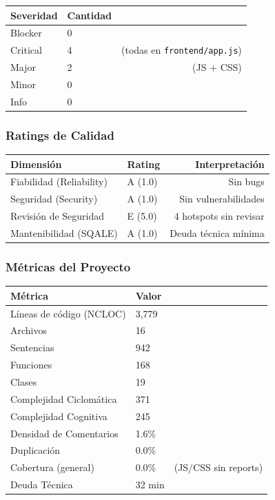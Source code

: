 \documentclass[12pt,a4paper]{article}
\begin{document}
\vspace{0.3cm}

\begin{tabularx}{\textwidth}{lXr}
  \toprule
  \textbf{Severidad} & \textbf{Cantidad} & \\
  \midrule
  Blocker & 0 & \\
  Critical & 4 & (todas en \texttt{frontend/app.js}) \\
  Major & 2 & (JS + CSS) \\
  Minor & 0 & \\
  Info & 0 & \\
  \bottomrule
\end{tabularx}

\subsubsection{Ratings de Calidad}

\begin{tabularx}{\textwidth}{lXr}
  \toprule
  \textbf{Dimensi\'on} & \textbf{Rating} & \textbf{Interpretaci\'on} \\
  \midrule
  Fiabilidad (Reliability) & A (1.0) & Sin bugs \\
  Seguridad (Security) & A (1.0) & Sin vulnerabilidades \\
  Revisi\'on de Seguridad & E (5.0) & 4 hotspots sin revisar \\
  Mantenibilidad (SQALE) & A (1.0) & Deuda t\'ecnica m\'inima \\
  \bottomrule
\end{tabularx}

\subsubsection{M\'etricas del Proyecto}

\begin{tabularx}{\textwidth}{lXr}
  \toprule
  \textbf{M\'etrica} & \textbf{Valor} & \\
  \midrule
  L\'ineas de c\'odigo (NCLOC) & 3,779 & \\
  Archivos & 16 & \\
  Sentencias & 942 & \\
  Funciones & 168 & \\
  Clases & 19 & \\
  Complejidad Ciclom\'atica & 371 & \\
  Complejidad Cognitiva & 245 & \\
  Densidad de Comentarios & 1.6\% & \\
  Duplicaci\'on & 0.0\% & \\
  Cobertura (general) & 0.0\% & (JS/CSS sin reports) \\
  Deuda T\'ecnica & 32 min & \\
  \bottomrule
\end{tabularx}
\end{document}
